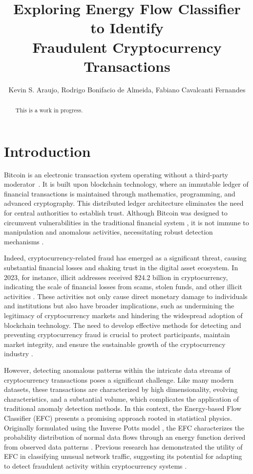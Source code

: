 \documentclass[12pt]{article}
\title{Exploring Energy Flow Classifier to Identify \\ Fraudulent Cryptocurrency Transactions}
\author{Kevin S. Araujo\inst{1}, Rodrigo Bonifacio de Almeida\inst{1}, 
  Fabiano Cavalcanti Fernandes\inst{2} }
\begin{document}
 

\maketitle

\begin{abstract}
  This is a work in progress.
\end{abstract}

\section{Introduction} \label{sec:introduction}

Bitcoin is an electronic transaction system operating without a third-party moderator~\cite{nakamoto2008bitcoin}. It is
built upon blockchain technology, where an immutable ledger of financial transactions is maintained through mathematics,
programming, and advanced cryptography. This distributed ledger architecture eliminates the need for central authorities
to establish trust. Although Bitcoin was designed to circumvent vulnerabilities in the traditional financial system
\cite{nakamoto2008bitcoin}, it is not immune to manipulation and anomalous activities, necessitating robust detection
mechanisms \cite{fang2022cryptocurrency, zhang2020financial,zainal2018review}. 

Indeed, cryptocurrency-related fraud has emerged as a significant threat, causing substantial financial losses and shaking
trust in the digital asset ecosystem. In 2023, for instance, illicit addresses received \$24.2 billion in cryptocurrency,
indicating the scale of financial losses from scams, stolen funds, and other illicit activities \cite{chainalysis2024cryptocrime}.
These activities not only cause direct monetary damage to individuals and institutions but also have broader implications,
such as undermining the legitimacy of cryptocurrency markets and hindering the widespread adoption of blockchain technology.
The need to develop effective methods for detecting and preventing cryptocurrency fraud is crucial to protect participants,
maintain market integrity, and ensure the sustainable growth of the cryptocurrency industry \cite{scharfman2024, Khiari2025}.

However, detecting anomalous patterns within the intricate data streams of cryptocurrency transactions poses a significant
challenge. Like many modern datasets, these transactions are characterized by high dimensionality, evolving characteristics,
and a substantial volume, which complicates the application of traditional anomaly detection methods. In this context, the
Energy-based Flow Classifier (EFC) presents a promising approach rooted in statistical physics. Originally formulated using
the Inverse Potts model \cite{pontes2019}, the EFC characterizes the probability distribution of normal data
flows through an energy function derived from observed data patterns \cite{pontes2019}. Previous research has demonstrated
the utility of EFC in classifying unusual network traffic, suggesting its potential for adapting to detect fraudulent
activity within cryptocurrency systems \cite{pontes2019, souza2022novelopensetenergybased}.
\end{document}
